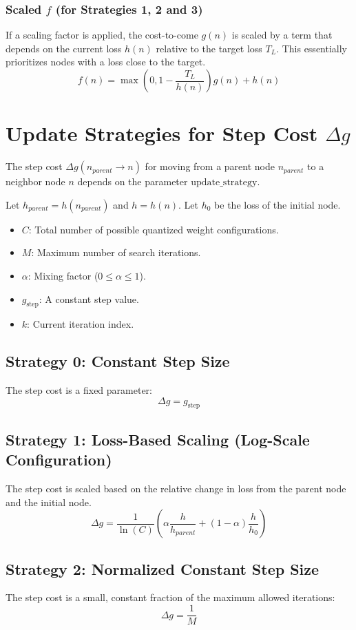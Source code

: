 \documentclass{article}
\begin{document}
\subsubsection{Scaled $f$ (for Strategies 1, 2 and 3)}
If a scaling factor is applied, the cost-to-come $g(n)$ is scaled by a term that depends on the current loss $h(n)$ relative to the target loss $T_L$. This essentially prioritizes nodes with a loss close to the target.
$$f(n) = \max\left(0, 1 - \frac{T_L}{h(n)}\right) g(n) + h(n)$$

\section{Update Strategies for Step Cost $\Delta g$}

The step cost $\Delta g(n_{parent} \to n)$ for moving from a parent node $n_{parent}$ to a neighbor node $n$ depends on the parameter $\text{update\_strategy}$.

Let $h_{parent} = h(n_{parent})$ and $h = h(n)$. Let $h_0$ be the loss of the initial node.
\begin{itemize}
    \item $C$: Total number of possible quantized weight configurations.
    \item $M$: Maximum number of search iterations.
    \item $\alpha$: Mixing factor ($0 \le \alpha \le 1$).
    \item $g_{\text{step}}$: A constant step value.
    \item $k$: Current iteration index.
\end{itemize}

\subsection{Strategy 0: Constant Step Size}
The step cost is a fixed parameter:
$$\Delta g = g_{\text{step}}$$

\subsection{Strategy 1: Loss-Based Scaling (Log-Scale Configuration)}
The step cost is scaled based on the relative change in loss from the parent node and the initial node.
$$\Delta g = \frac{1}{\ln(C)} \left( \alpha \frac{h}{h_{parent}} + (1-\alpha) \frac{h}{h_0} \right)$$

\subsection{Strategy 2: Normalized Constant Step Size}
The step cost is a small, constant fraction of the maximum allowed iterations:
$$\Delta g = \frac{1}{M}$$
\end{document}
